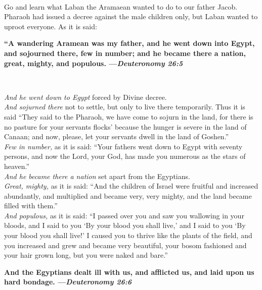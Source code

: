 \documentclass[a4paper,10pt,openany]{memoir}
\newcommand{\HgInst}[1]{{\noindent\sffamily{\bfseries{#1}}}}
\newcommand{\HgSource}[1]{\hfill{\small---\itshape{#1}}}
\newcommand{\HgHL}[1]{{\Large\textbf{#1}\par\noindent\\[-.5em]}}
\newenvironment{HgEnglish}{\strut\\\noindent}{\vspace{1em}}
\begin{document}

\vspace{-2em}
\begin{HgEnglish}
Go and learn what Laban the Aramaean wanted to do to our father Jacob. Pharaoh
had issued a decree against the male children only, but Laban wanted to uproot
everyone. As it is said: 
\end{HgEnglish}

\noindent
\HgHL{%
  ``A wandering Aramean was my father, and he went
  down into Egypt, and sojourned there, few in number; and he became there a
  nation, great, mighty, and populous.
  \HgSource{Deuteronomy 26:5}
}

\vspace{-.5em}
{
  \small
  \noindent
  {\itshape And he went down to Egypt} forced by Divine decree.\\[1em]
  {\itshape And sojurned there} not to settle, but only to live there temporarily.
  Thus it is said ``They said to the Pharaoh, we have come to sojurn in the
  land, for there is no pasture for your servants flocks' because the hunger is
  severe in the land of Canaan; and now, please, let your servants dwell in the
  land of Goshen.''\\[1em]
  {\itshape Few in number,} as it is said: ``Your fathers went down to Egypt with
  seventy persons, and now the Lord, your God, has made you numerous as the
  stars of heaven.''\\[1em]
  {\itshape And he became there a nation} set apart from the Egyptians.\\[1em]
  {\itshape Great, mighty,} as it is said: ``And the children of Israel were fruitful and
  increased abundantly, and multiplied and became very, very mighty, and the land
  became filled with them.''\\[1em]
  {\itshape And populous,} as it is said: ``I passed over you and saw you wallowing in
  your bloods, and I said to you `By your blood you shall live,' and I said to you
  `By your blood you shall live!' I caused you to thrive like the plants of the
  field, and you increased and grew and became very beautiful, your bosom
  fashioned and your hair grown long, but you were naked and bare.''\\[1em]
}

\noindent
\HgHL{%
  And the Egyptians dealt ill with us, and
  afflicted us, and laid upon us hard bondage. 
  \HgSource{Deuteronomy 26:6}
}
\end{document}
